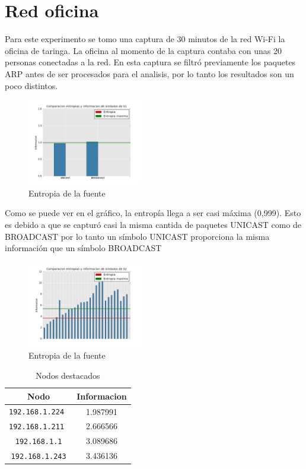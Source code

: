 \section{Red oficina}

Para este experimento se tomo una captura de 30 minutos de la red Wi-Fi la oficina de taringa.
La oficina al momento de la captura contaba con unas 20 personas conectadas a la red.
En esta captura se filtró previamente los paquetes ARP antes de ser procesados para el analisis,
por lo tanto los resultados son un poco distintos.

\begin{figure}[H]
  \centering
    \includegraphics[width=0.45\textwidth]{grafico1-red-taringa.png}
  \caption{Entropia de la fuente}
  \label{entropia-taringa-1}
\end{figure}

Como se puede ver en el gráfico, la entropía llega a ser casi máxima (0,999). 
Esto es debido a que se capturó casi la misma cantida de paquetes UNICAST como de BROADCAST
por lo tanto un símbolo UNICAST proporciona la misma información que un símbolo BROADCAST 

\begin{figure}[H]
  \centering
    \includegraphics[width=0.45\textwidth]{grafico2-red-taringa.png}
  \caption{Entropia de la fuente}
  \label{entropia-taringa-2}
\end{figure}

    \begin{table}[ht]\begin{center}
      \begin{tabular}{|c|c|}
      \hline
      \textbf{Nodo} & \textbf{Informacion} \\ \hline
      \texttt{192.168.1.224 }& 1.987991 \\ \hline
      \texttt{192.168.1.211 }& 2.666566 \\ \hline
      \texttt{192.168.1.1}& 3.089686 \\ \hline
      \texttt{192.168.1.243}& 3.436136 \\ \hline
      \end{tabular}
      \caption{Nodos destacados}
      \label{Nodos-destacados-taringa}
    \end{center}\end{table}

